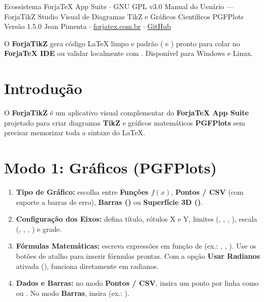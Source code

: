 \documentclass[11pt,a4paper]{article}
\begin{document}
  {Ecossistema ForjaTeX App Suite $\cdot$ GNU GPL v3.0}
  {Manual do Usuário --- ForjaTikZ}
  {Studio Visual de Diagramas TikZ e Gráficos Científicos PGFPlots}
  {Versão 1.5.0}
  {Jean Pimenta $\cdot$ \href{https://forjatex.com.br}{\color{fjsky}forjatex.com.br} $\cdot$ \href{https://github.com/jeanjpimenta/forjatex-suite}{\color{fjsky}GitHub}}


\begin{fjcallout}
O \textbf{ForjaTikZ} gera código \LaTeX{} limpo e padrão ( e ) pronto para colar no \textbf{ForjaTeX IDE} ou validar localmente com . Disponível para Windows e Linux.
\end{fjcallout}

\section{Introdução}
O \textbf{ForjaTikZ} é um aplicativo visual complementar do \textbf{ForjaTeX App Suite} projetado para criar diagramas \textbf{TikZ} e gráficos matemáticos \textbf{PGFPlots} sem precisar memorizar toda a sintaxe do \LaTeX{}.

\section{Modo 1: Gráficos (PGFPlots)}
\begin{enumerate}
  \item \textbf{Tipo de Gráfico:} escolha entre \textbf{Funções $f(x)$}, \textbf{Pontos / CSV} (com suporte a barras de erro), \textbf{Barras ()} ou \textbf{Superfície 3D ()}.
  \item \textbf{Configuração dos Eixos:} defina título, rótulos X e Y, limites (, , , ), escala (, , , ) e grade.
  \item \textbf{Fórmulas Matemáticas:} escreva expressões em função de  (ex.: , , ). Use os botões de atalho para inserir fórmulas prontas. Com a opção \textbf{Usar Radianos} ativada (),  funciona diretamente em radianos.
  \item \textbf{Dados e Barras:} no modo \textbf{Pontos / CSV}, insira um ponto por linha como  ou . No modo \textbf{Barras}, insira  (ex.: ).
\end{enumerate}
\end{document}
